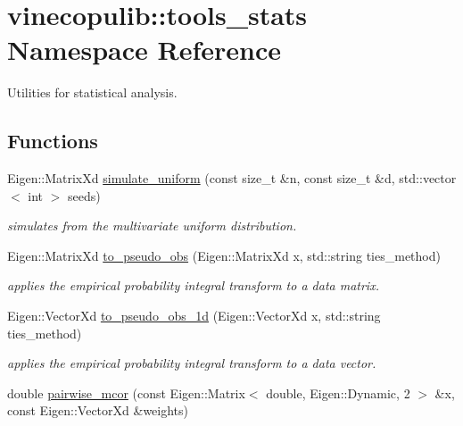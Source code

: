 \hypertarget{namespacevinecopulib_1_1tools__stats}{}\section{vinecopulib\+:\+:tools\+\_\+stats Namespace Reference}
\label{namespacevinecopulib_1_1tools__stats}


Utilities for statistical analysis.  


\subsection*{Functions}
\begin{DoxyCompactItemize}
\item 
Eigen\+::\+Matrix\+Xd \hyperlink{namespacevinecopulib_1_1tools__stats_a4f9a1f8fdbe23db916b013f7f6e500ca}{simulate\+\_\+uniform} (const size\+\_\+t \&n, const size\+\_\+t \&d, std\+::vector$<$ int $>$ seeds)
\begin{DoxyCompactList}\small\item\em simulates from the multivariate uniform distribution. \end{DoxyCompactList}\item 
Eigen\+::\+Matrix\+Xd \hyperlink{namespacevinecopulib_1_1tools__stats_afda41507cee7cba84602e28e56cfcd99}{to\+\_\+pseudo\+\_\+obs} (Eigen\+::\+Matrix\+Xd x, std\+::string ties\+\_\+method)
\begin{DoxyCompactList}\small\item\em applies the empirical probability integral transform to a data matrix. \end{DoxyCompactList}\item 
Eigen\+::\+Vector\+Xd \hyperlink{namespacevinecopulib_1_1tools__stats_a9e4849a2a908703a68e92e0c0633237f}{to\+\_\+pseudo\+\_\+obs\+\_\+1d} (Eigen\+::\+Vector\+Xd x, std\+::string ties\+\_\+method)
\begin{DoxyCompactList}\small\item\em applies the empirical probability integral transform to a data vector. \end{DoxyCompactList}\item 
\mbox{\label{namespacevinecopulib_1_1tools__stats_a95f6f6f63139c26b7114c4eb9cc22c48}} 
double \hyperlink{namespacevinecopulib_1_1tools__stats_a95f6f6f63139c26b7114c4eb9cc22c48}{pairwise\+\_\+mcor} (const Eigen\+::\+Matrix$<$ double, Eigen\+::\+Dynamic, 2 $>$ \&x, const Eigen\+::\+Vector\+Xd \&weights)

\end{DoxyCompactItemize}
